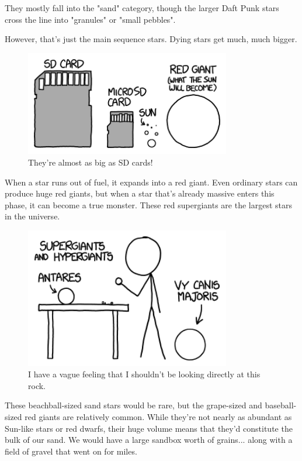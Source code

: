 {{They mostly fall into the "sand" category, though the larger Daft Punk stars cross the line into "granules" or "small pebbles".}

{However, that's just the main sequence stars. Dying stars get much, much bigger.}

\begin{figure}[!htbp]
\centering
\includegraphics[scale=0.5, max width=0.8\textwidth]{imgs/a/83/sand_red.png}
\caption{They're almost as big as SD cards!}
\end{figure}

{When a star runs out of fuel, it expands into a red giant. Even ordinary stars can produce huge red giants, but when a star that's already massive enters this phase, it can become a true monster. These red supergiants are the largest stars in the universe.}

\begin{figure}[!htbp]
\centering
\includegraphics[scale=0.5, max width=0.8\textwidth]{imgs/a/83/sand_hyper.png}
\caption{I have a vague feeling that I shouldn't be looking directly at this rock.}
\end{figure}

{These beachball-sized sand stars would be rare, but the grape-sized and baseball-sized red giants are relatively common. While they're not nearly as abundant as Sun-like stars or red dwarfs, their huge volume means that they'd constitute the bulk of our sand. We would have a large sandbox worth of grains... along with a field of gravel that went on for miles.}

}

